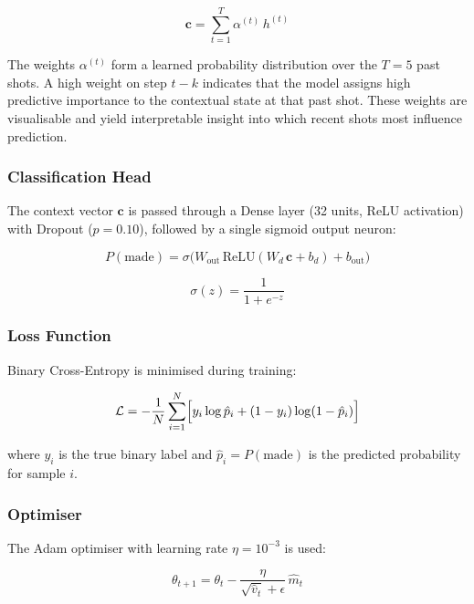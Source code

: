 \documentclass[conference]{IEEEtran}
\begin{document}
\begin{equation}
\mathbf{c} = \sum_{t=1}^{T} \alpha^{(t)}\, h^{(t)}
\end{equation}

The weights $\alpha^{(t)}$ form a learned probability distribution over
the $T\!=\!5$ past shots.  A high weight on step $t{-}k$ indicates that
the model assigns high predictive importance to the contextual state at
that past shot.  These weights are visualisable and yield interpretable
insight into which recent shots most influence prediction.

\subsubsection{Classification Head}
The context vector $\mathbf{c}$ is passed through a Dense layer (32
units, ReLU activation) with Dropout ($p\!=\!0.10$), followed by a
single sigmoid output neuron:

\begin{equation}
P(\text{made}) = \sigma\!\bigl(W_{\text{out}}\,\text{ReLU}(W_d\,\mathbf{c}+b_d)+b_{\text{out}}\bigr)
\end{equation}

\begin{equation}
\sigma(z) = \frac{1}{1+e^{-z}}
\end{equation}

\subsubsection{Loss Function}
Binary Cross-Entropy is minimised during training:

\begin{equation}
\mathcal{L} = -\frac{1}{N}\sum_{i=1}^{N}
\Bigl[y_i\log\hat{p}_i + (1-y_i)\log(1-\hat{p}_i)\Bigr]
\end{equation}

where $y_i$ is the true binary label and $\hat{p}_i = P(\text{made})$
is the predicted probability for sample $i$.

\subsubsection{Optimiser}
The Adam optimiser with learning rate $\eta=10^{-3}$ is used:

\begin{equation}
\theta_{t+1} = \theta_t -
\frac{\eta}{\sqrt{\hat{v}_t}+\epsilon}\,\hat{m}_t
\end{equation}
\end{document}
